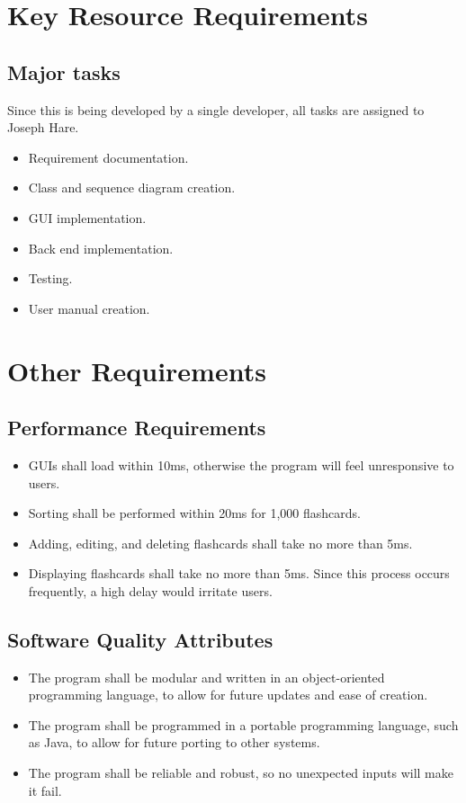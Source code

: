 \documentclass{scrreprt}
\begin{document}
\chapter{Key Resource Requirements}

\section{Major tasks}
Since this is being developed by a single developer, all tasks are assigned to Joseph Hare.
\begin{itemize}
    \item Requirement documentation.
    \item Class and sequence diagram creation.
    \item GUI implementation.
    \item Back end implementation.
    \item Testing.
    \item User manual creation.
\end{itemize}


\chapter{Other Requirements}

\section{Performance Requirements}
\begin{itemize}
    \item GUIs shall load within 10ms, otherwise the program will feel unresponsive to users.
    \item Sorting shall be performed within 20ms for 1,000 flashcards.
    \item Adding, editing, and deleting flashcards shall take no more than 5ms.
    \item Displaying flashcards shall take no more than 5ms.
        Since this process occurs frequently, a high delay would irritate users.
\end{itemize}

\section{Software Quality Attributes}
\begin{itemize}
    \item The program shall be modular and written in an object-oriented programming language,
        to allow for future updates and ease of creation.
    \item The program shall be programmed in a portable programming language,
        such as Java, to allow for future porting to other systems.
    \item The program shall be reliable and robust, so no unexpected inputs will
        make it fail.
\end{itemize}
\end{document}
